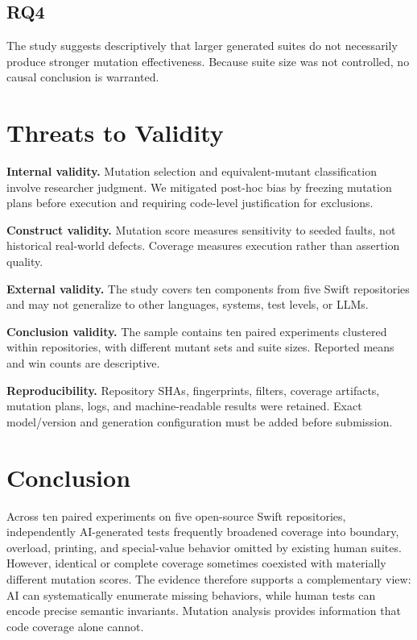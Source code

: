 \documentclass[10pt,conference]{IEEEtran}
\begin{document}
\subsection{RQ4}
The study suggests descriptively that larger generated suites do not necessarily produce stronger mutation effectiveness. Because suite size was not controlled, no causal conclusion is warranted.

\section{Threats to Validity}
\textbf{Internal validity.} Mutation selection and equivalent-mutant classification involve researcher judgment. We mitigated post-hoc bias by freezing mutation plans before execution and requiring code-level justification for exclusions.

\textbf{Construct validity.} Mutation score measures sensitivity to seeded faults, not historical real-world defects. Coverage measures execution rather than assertion quality.

\textbf{External validity.} The study covers ten components from five Swift repositories and may not generalize to other languages, systems, test levels, or LLMs.

\textbf{Conclusion validity.} The sample contains ten paired experiments clustered within repositories, with different mutant sets and suite sizes. Reported means and win counts are descriptive.

\textbf{Reproducibility.} Repository SHAs, fingerprints, filters, coverage artifacts, mutation plans, logs, and machine-readable results were retained. Exact model/version and generation configuration must be added before submission.

\section{Conclusion}
Across ten paired experiments on five open-source Swift repositories, independently AI-generated tests frequently broadened coverage into boundary, overload, printing, and special-value behavior omitted by existing human suites. However, identical or complete coverage sometimes coexisted with materially different mutation scores. The evidence therefore supports a complementary view: AI can systematically enumerate missing behaviors, while human tests can encode precise semantic invariants. Mutation analysis provides information that code coverage alone cannot.
\end{document}
